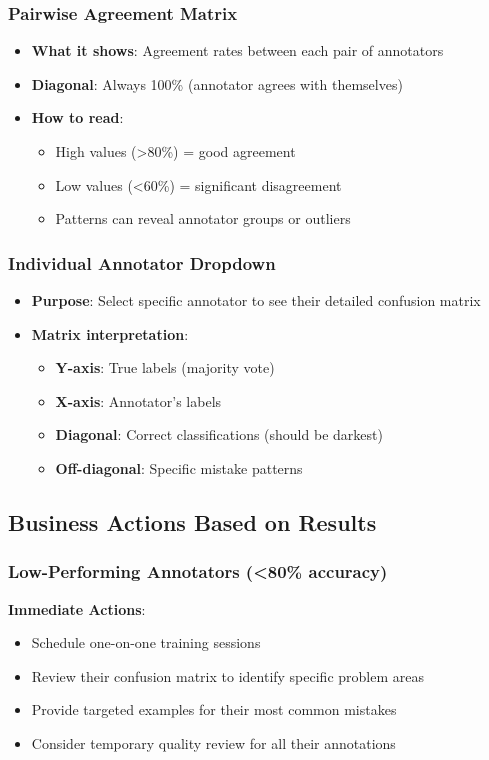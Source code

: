 \documentclass[11pt]{article}
\begin{document}
\subsubsection{Pairwise Agreement Matrix}
\begin{itemize}
\item \textbf{What it shows}: Agreement rates between each pair of annotators
\item \textbf{Diagonal}: Always 100\% (annotator agrees with themselves)
\item \textbf{How to read}: 
\begin{itemize}
\item High values (>80\%) = good agreement
\item Low values (<60\%) = significant disagreement
\item Patterns can reveal annotator groups or outliers
\end{itemize}
\end{itemize}

\subsubsection{Individual Annotator Dropdown}
\begin{itemize}
\item \textbf{Purpose}: Select specific annotator to see their detailed confusion matrix
\item \textbf{Matrix interpretation}:
\begin{itemize}
\item \textbf{Y-axis}: True labels (majority vote)
\item \textbf{X-axis}: Annotator's labels
\item \textbf{Diagonal}: Correct classifications (should be darkest)
\item \textbf{Off-diagonal}: Specific mistake patterns
\end{itemize}
\end{itemize}

\subsection{Business Actions Based on Results}

\subsubsection{Low-Performing Annotators (<80\% accuracy)}
\textbf{Immediate Actions}:
\begin{itemize}
\item Schedule one-on-one training sessions
\item Review their confusion matrix to identify specific problem areas
\item Provide targeted examples for their most common mistakes
\item Consider temporary quality review for all their annotations
\end{itemize}
\end{document}
